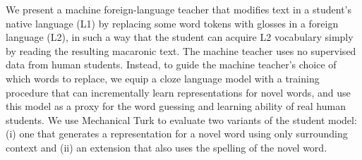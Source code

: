 We present a machine foreign-language teacher that modifies text in a student's native language (L1) by replacing some word tokens with glosses in a foreign language (L2), in such a way that the student can acquire L2 vocabulary simply by reading the resulting macaronic text. The machine teacher uses no supervised data from human students.  Instead, to guide the machine teacher's choice of which words to replace, we equip a cloze language model with a training procedure that can incrementally learn representations for novel words, and use this model as a proxy for the word guessing and learning ability of real human students. We use Mechanical Turk to evaluate two variants of the student model: (i) one that generates a representation for a novel word using only surrounding context and (ii) an extension that also uses the spelling of the novel word.